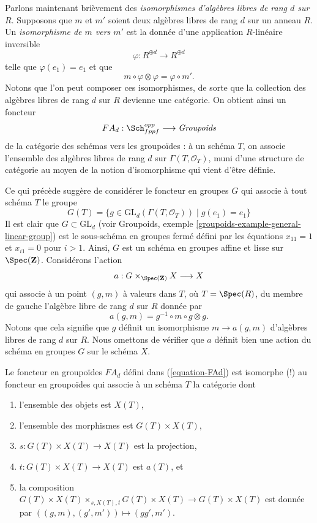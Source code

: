 \medskip\noindent
Parlons maintenant brièvement des {\it isomorphismes d'algèbres libres de rang $d$
sur $R$}. Supposons que $m$ et $m'$ soient deux algèbres libres de rang $d$
sur un anneau $R$. Un {\it isomorphisme de $m$ vers $m'$} est la donnée d'une
application $R$-linéaire inversible
$$
\varphi : R^{\oplus d} \longrightarrow R^{\oplus d}
$$
telle que $\varphi(e_1) = e_1$ et que
$$
m \circ \varphi \otimes \varphi = \varphi \circ m'.
$$
Notons que l'on peut composer ces isomorphismes, de sorte que la collection des
algèbres libres de rang $d$ sur $R$ devienne une catégorie.
On obtient ainsi un foncteur
\begin{equation}
\label{equation-FAd}
FA_d : \Sch_{fppf}^{opp} \longrightarrow \textit{Groupoids}
\end{equation}
de la catégorie des schémas vers les groupoïdes : à un schéma $T$, on associe
l'ensemble des algèbres libres de rang $d$ sur $\Gamma(T, \mathcal{O}_T)$,
muni d'une structure
de catégorie au moyen de la notion d'isomorphisme qui vient d'être définie.

\medskip\noindent
Ce qui précède suggère de considérer le foncteur en groupes $G$
qui associe à tout schéma $T$ le groupe
$$
G(T) = \{g \in \text{GL}_d(\Gamma(T, \mathcal{O}_T)) \mid g(e_1) = e_1\}
$$
Il est clair que $G \subset \text{GL}_d$ (voir
Groupoids, exemple \ref{groupoids-example-general-linear-group})
est le sous-schéma en groupes fermé défini par les équations
$x_{11} = 1$ et $x_{i1} = 0$ pour $i > 1$. Ainsi, $G$ est un
schéma en groupes affine et lisse sur $\Spec(\mathbf{Z})$. Considérons
l'action
$$
a : G \times_{\Spec(\mathbf{Z})} X \longrightarrow X
$$
qui associe à un point $(g, m)$ à valeurs dans $T$, où $T = \Spec(R)$,
du membre de gauche l'algèbre libre de rang $d$ sur $R$
donnée par
$$
a(g, m) = g^{-1} \circ m \circ g \otimes g.
$$
Notons que cela signifie que $g$ définit un isomorphisme $m \to a(g, m)$
d'algèbres libres de rang $d$ sur $R$. Nous omettons de vérifier que
$a$ définit bien une action du schéma en groupes $G$ sur le schéma $X$.

\begin{lemma}
\label{lemma-represent-FAd}
Le foncteur en groupoïdes $FA_d$ défini dans (\ref{equation-FAd})
est isomorphe (!) au foncteur en groupoïdes qui associe
à un schéma $T$ la catégorie dont
\begin{enumerate}
\item l'ensemble des objets est $X(T)$,
\item l'ensemble des morphismes est $G(T) \times X(T)$,
\item $s : G(T) \times X(T) \to X(T)$ est la projection,
\item $t : G(T) \times X(T) \to X(T)$ est $a(T)$, et
\item la composition $G(T) \times X(T) \times_{s, X(T), t} G(T) \times X(T)
\to G(T) \times X(T)$ est donnée par $((g, m), (g', m')) \mapsto (gg', m')$.
\end{enumerate}
\end{lemma}

